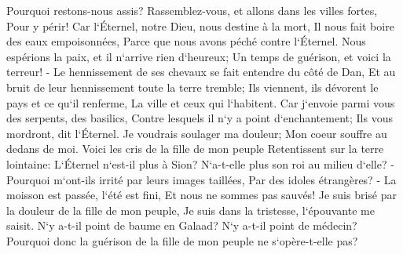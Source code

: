 \verse Pourquoi restons-nous assis? Rassemblez-vous, et allons dans les villes fortes, Pour y périr! Car l`Éternel, notre Dieu, nous destine à la mort, Il nous fait boire des eaux empoisonnées, Parce que nous avons péché contre l`Éternel. 
\verse Nous espérions la paix, et il n`arrive rien d`heureux; Un temps de guérison, et voici la terreur! - 
\verse Le hennissement de ses chevaux se fait entendre du côté de Dan, Et au bruit de leur hennissement toute la terre tremble; Ils viennent, ils dévorent le pays et ce qu`il renferme, La ville et ceux qui l`habitent. 
\verse Car j`envoie parmi vous des serpents, des basilics, Contre lesquels il n`y a point d`enchantement; Ils vous mordront, dit l`Éternel. 
\verse Je voudrais soulager ma douleur; Mon coeur souffre au dedans de moi. 
\verse Voici les cris de la fille de mon peuple Retentissent sur la terre lointaine: L`Éternel n`est-il plus à Sion? N`a-t-elle plus son roi au milieu d`elle? -Pourquoi m`ont-ils irrité par leurs images taillées, Par des idoles étrangères? - 
\verse La moisson est passée, l`été est fini, Et nous ne sommes pas sauvés! 
\verse Je suis brisé par la douleur de la fille de mon peuple, Je suis dans la tristesse, l`épouvante me saisit. 
\verse N`y a-t-il point de baume en Galaad? N`y a-t-il point de médecin? Pourquoi donc la guérison de la fille de mon peuple ne s`opère-t-elle pas? 

